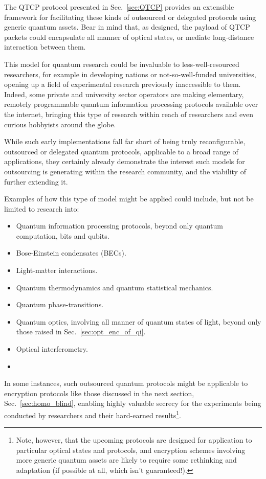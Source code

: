 \documentclass[aps, rmp, twocolumn, amsmath, amssymb, nofootinbib, superscriptaddress, longbibliography, floatfix, table-of-contents, eqsecnum]{revtex4-1}
\newcommand{\comment}[1]{{\color{blue}{\textbf{#1}}}}
\begin{document}
The QTCP protocol presented in Sec.~\ref{sec:QTCP} provides an extensible framework for facilitating these kinds of outsourced or delegated protocols using generic quantum assets. Bear in mind that, as designed, the payload of QTCP packets could encapsulate all manner of optical states, or mediate long-distance interaction between them.

This model for quantum research could be invaluable to less-well-resourced researchers, for example in developing nations or not-so-well-funded universities, opening up a field of experimental research previously inaccessible to them. Indeed, some private and university sector operators are making elementary, remotely programmable quantum information processing protocols available over the internet, bringing this type of research within reach of researchers and even curious hobbyists around the globe.

While such early implementations fall far short of being truly reconfigurable, outsourced or delegated quantum protocols, applicable to a broad range of applications, they certainly already demonstrate the interest such models for outsourcing is generating within the research community, and the viability of further extending it.

Examples of how this type of model might be applied could include, but not be limited to research into:
\begin{itemize}
	\item Quantum information processing protocols, beyond only quantum computation, bits and qubits.
	\item Bose-Einstein condensates (BECs).
	\item Light-matter interactions.
	\item Quantum thermodynamics and quantum statistical mechanics.
	\item Quantum phase-transitions.
	\item Quantum optics, involving all manner of quantum states of light, beyond only those raised in Sec.~\ref{sec:opt_enc_of_qi}.
	\item Optical interferometry.
	\item \comment{More!}
\end{itemize}

In some instances, such outsourced quantum protocols might be applicable to encryption protocols like those discussed in the next section, Sec.~\ref{sec:homo_blind}, enabling highly valuable secrecy for the experiments being conducted by researchers and their hard-earned results\footnote{Note, however, that the upcoming protocols are designed for application to particular optical states and protocols, and encryption schemes involving more generic quantum assets are likely to require some rethinking and adaptation (if possible at all, which isn't guaranteed!).}.
\end{document}
